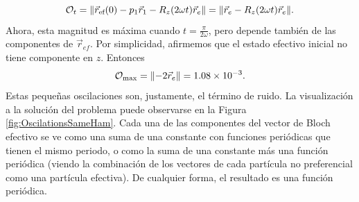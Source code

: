 \begin{equation}
    \mathcal{O}_{t}=\norm{\vec{r}_{\text{ef}}(0)-p_{1}\vec{r}_{1}-R_{z}(2\omega t)\vec{r}_{e}}=\norm{\vec{r}_{e}-R_{z}(2\omega t)\vec{r}_{e}}\nonumber.
\end{equation}
Ahora, esta magnitud es máxima cuando $t=\frac{\pi}{2\omega}$, pero depende también de las componentes de $\vec{r}_{ef}$. Por simplicidad, afirmemos que el estado efectivo inicial no tiene componente en $z$. Entonces
\begin{equation}
    \mathcal{O}_{\max}=\norm{-2\vec{r}_{e}}=1.08\times 10^{-3}\nonumber.
\end{equation}
Estas pequeñas oscilaciones son, justamente, el término de ruido. La visualización a la solución del problema puede observarse en la Figura \ref{fig:OscilationsSameHam}. Cada una de las componentes del vector de Bloch efectivo se ve como una suma de una constante con funciones periódicas que tienen el mismo periodo, o  como la suma de una constante más una función periódica (viendo la combinación de los vectores de cada partícula no preferencial como una partícula efectiva). De cualquier forma, el resultado es una función periódica.

